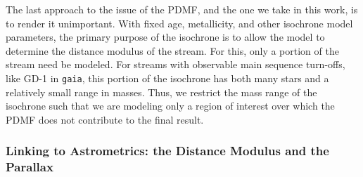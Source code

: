 \documentclass[twocolumn]{aastex631}
\newcommand{\stream}[1]{#1}
\newcommand{\dataarchive}[1]{\texttt{#1}}
\newcommand{\gaia}{\dataarchive{gaia}}
\begin{document}
            The last approach to the issue of the PDMF, and the one we take in
            this work, is to render it unimportant.  With fixed age,
            metallicity, and other isochrone model parameters, the primary
            purpose of the isochrone is to allow the model to determine the
            distance modulus of the stream. For this, only a portion of the
            stream need be modeled.  For streams with observable main sequence
            turn-offs, like \stream{GD-1} in \gaia, this portion of the
            isochrone has both many stars and a relatively small range in
            masses. Thus, we restrict the mass range of the isochrone such that
            we are modeling only a region of interest over which the PDMF does
            not contribute to the final result.


        \subsubsection{Linking to Astrometrics: the Distance Modulus and the Parallax} \label{ssub:method:linking_to_astrometrics}
\end{document}
